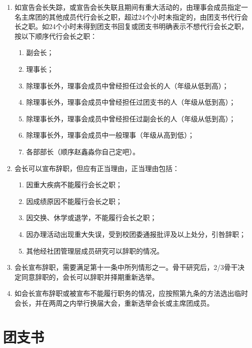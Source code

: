 \begin{enumerate}[resume]
    \item 如宣告会长失踪，或宣告会长失联且期间有重大活动的，由理事会成员指定一名主席团的其他成员代行会长之职，超过24个小时未指定的，由团支书代行会长之职。如24个小时未得到团支书回复或团支书明确表示不想代行会长之职，按以下顺序代行会长之职：
    
    \begin{enumerate}
        \item 副会长；
        \item 理事长；
        \item 除理事长外，理事会成员中曾经担任过会长的人（年级从低到高）；
        \item 除理事长外，理事会成员中曾经担任过团支书的人（年级从低到高）；
        \item 除理事长外，理事会成员中曾经担任过副会长的人（年级从低到高）；
        \item 除理事长外，理事会成员中一般理事（年级从高到低）；
        \item 各部部长（顺序赵鑫淼你自己定吧）。
    \end{enumerate}
    
    \item 会长可以宣布辞职，但应有正当理由，正当理由包括：
    
    \begin{enumerate}
        \item 因重大疾病不能履行会长之职；
        \item 因成绩原因不能履行会长之职；
        \item 因交换、休学或退学，不能履行会长之职；
        \item 因办理活动出现重大失误，受到校团委通报批评及以上处分，引咎辞职；
        \item 其他经社团管理层成员研究可以辞职的情况。
    \end{enumerate}

    \item 会长宣布辞职，需要满足第十一条中所列情形之一。骨干研究后，2/3骨干决定同意辞职的，会长可以辞职并择期重新选举。
    
    \item 如会长宣布辞职或被宣布不能履行职务的情况，应按照第九条的方法选出临时会长，并在两周之内举行换届大会，重新选举会长或主席团成员。
\end{enumerate}

\section{团支书}


